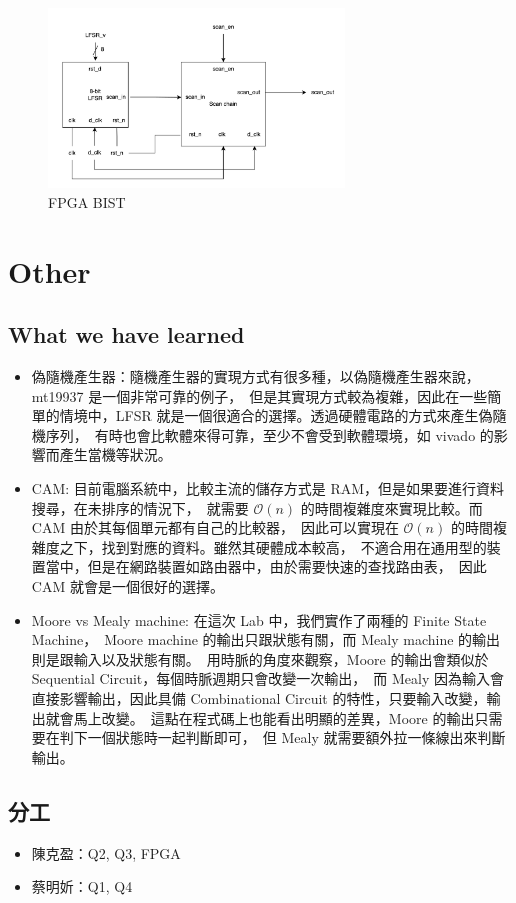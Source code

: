 \documentclass[10.5pt,compsoc,UTF8]{CjC}
\theoremstyle{mystyle}
\begin{document}
\begin{figure}[h!]
  \centering
  \includegraphics[width=0.7\textwidth]{./img/FPGA-BIST.png}
  \caption{FPGA BIST}
  \label{fig:Q4-BIST}
\end{figure}

\section{Other}

\subsection{What we have learned}
\begin{itemize}
  \item 偽隨機產生器：隨機產生器的實現方式有很多種，以偽隨機產生器來說，mt19937 是一個非常可靠的例子，\
  但是其實現方式較為複雜，因此在一些簡單的情境中，LFSR 就是一個很適合的選擇。透過硬體電路的方式來產生偽隨機序列，\
  有時也會比軟體來得可靠，至少不會受到軟體環境，如 vivado 的影響而產生當機等狀況。
  \item CAM: 目前電腦系統中，比較主流的儲存方式是 RAM，但是如果要進行資料搜尋，在未排序的情況下，\
  就需要 $\mathcal{O}(n)$ 的時間複雜度來實現比較。而 CAM 由於其每個單元都有自己的比較器，\
  因此可以實現在 $\mathcal{O}(n)$ 的時間複雜度之下，找到對應的資料。雖然其硬體成本較高，\
  不適合用在通用型的裝置當中，但是在網路裝置如路由器中，由於需要快速的查找路由表，\
  因此 CAM 就會是一個很好的選擇。
  \item Moore vs Mealy machine: 在這次 Lab 中，我們實作了兩種的 Finite State Machine，\
  Moore machine 的輸出只跟狀態有關，而 Mealy machine 的輸出則是跟輸入以及狀態有關。\
  用時脈的角度來觀察，Moore 的輸出會類似於 Sequential Circuit，每個時脈週期只會改變一次輸出，\
  而 Mealy 因為輸入會直接影響輸出，因此具備 Combinational Circuit 的特性，只要輸入改變，輸出就會馬上改變。\
  這點在程式碼上也能看出明顯的差異，Moore 的輸出只需要在判下一個狀態時一起判斷即可，\
  但 Mealy 就需要額外拉一條線出來判斷輸出。       
\end{itemize}

\subsection{分工}
\begin{itemize}
  \item 陳克盈：Q2, Q3, FPGA
  \item 蔡明妡：Q1, Q4
\end{itemize}
\end{document}
